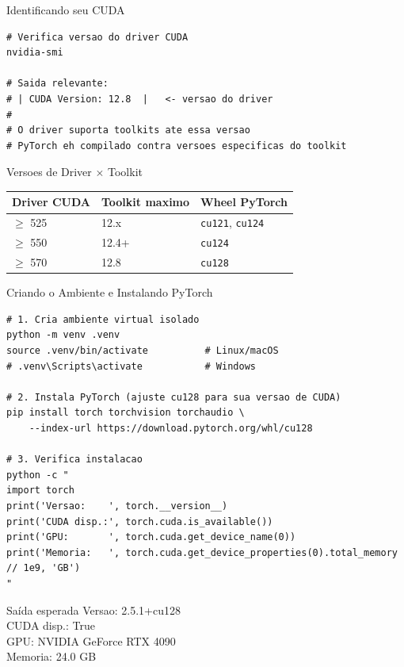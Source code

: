 \documentclass[aspectratio=169, 10pt]{beamer}
\begin{document}
\begin{frame}[fragile]{Identificando seu CUDA}
\begin{lstlisting}[style=bash]
# Verifica versao do driver CUDA
nvidia-smi

# Saida relevante:
# | CUDA Version: 12.8  |   <- versao do driver
#
# O driver suporta toolkits ate essa versao
# PyTorch eh compilado contra versoes especificas do toolkit
\end{lstlisting}

\vspace{0.5em}
\begin{block}{Versoes de Driver $\times$ Toolkit}
  \centering
  \begin{tabular}{lll}
    \toprule
    Driver CUDA & Toolkit maximo & Wheel PyTorch \\
    \midrule
    $\geq$ 525 & 12.x & \texttt{cu121}, \texttt{cu124} \\
    $\geq$ 550 & 12.4+ & \texttt{cu124} \\
    $\geq$ 570 & 12.8 & \texttt{cu128} \\
    \bottomrule
  \end{tabular}
\end{block}
\end{frame}


\begin{frame}[fragile]{Criando o Ambiente e Instalando PyTorch}
\begin{lstlisting}[style=bash]
# 1. Cria ambiente virtual isolado
python -m venv .venv
source .venv/bin/activate          # Linux/macOS
# .venv\Scripts\activate           # Windows

# 2. Instala PyTorch (ajuste cu128 para sua versao de CUDA)
pip install torch torchvision torchaudio \
    --index-url https://download.pytorch.org/whl/cu128

# 3. Verifica instalacao
python -c "
import torch
print('Versao:    ', torch.__version__)
print('CUDA disp.:', torch.cuda.is_available())
print('GPU:       ', torch.cuda.get_device_name(0))
print('Memoria:   ', torch.cuda.get_device_properties(0).total_memory // 1e9, 'GB')
"
\end{lstlisting}

\begin{exampleblock}{Saída esperada}
  \ttfamily\scriptsize
  Versao:     2.5.1+cu128 \\
  CUDA disp.: True \\
  GPU:        NVIDIA GeForce RTX 4090 \\
  Memoria:    24.0 GB
\end{exampleblock}
\end{frame}
\end{document}
